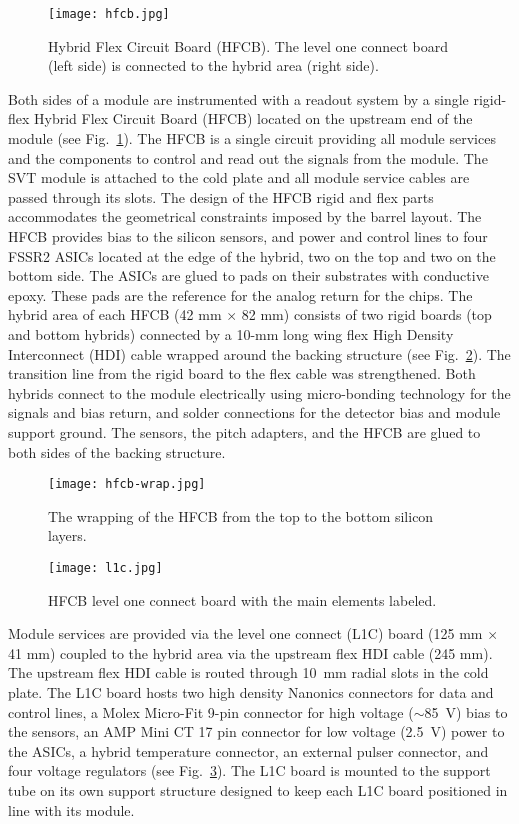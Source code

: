 \begin{figure}[h] 
\centering 
\texttt{[image: hfcb.jpg]}
\caption{Hybrid Flex Circuit Board (HFCB). The level one connect board (left side) is connected to the hybrid area (right side).}
\label{fig:HFCB}
\end{figure}

Both sides of a module are instrumented with a readout system by a single rigid-flex Hybrid Flex Circuit Board (HFCB) located on the upstream end of the module (see Fig.~\ref{fig:HFCB}). The HFCB is a single circuit providing all module services and the components to control and read out the signals from the module. The SVT module is attached to the cold plate and all module service cables are passed through its slots. The design of the HFCB rigid and flex parts accommodates the geometrical constraints imposed by the barrel layout. The HFCB provides bias to the silicon sensors, and power and control lines to four FSSR2 ASICs located at the edge of the hybrid, two on the top and two on the bottom side. The ASICs are glued to pads on their substrates with conductive epoxy. These pads are the reference for the analog return for the chips. The hybrid area of each HFCB (42 mm $\times$ 82 mm) consists of two rigid boards (top and bottom hybrids) connected by a 10-mm long wing flex High Density Interconnect (HDI) cable wrapped around the backing structure (see Fig.~\ref{fig:hfcb-wrap}). The transition line from the rigid board to the flex cable was strengthened. Both hybrids connect to the module electrically using micro-bonding technology for the signals and bias return, and solder connections for the detector bias and module support ground. The sensors, the pitch adapters, and the HFCB are glued to both sides of the backing structure. 

\begin{figure}[h] 
\centering 
\texttt{[image: hfcb-wrap.jpg]}
\caption{The wrapping of the HFCB from the top to the bottom silicon layers.}
\label{fig:hfcb-wrap}
\end{figure}

\begin{figure}[h] 
\centering 
\texttt{[image: l1c.jpg]}
\caption{HFCB level one connect board with the main elements labeled.}
\label{fig:l1c}
\end{figure}

Module services are provided via the level one connect (L1C) board (125 mm $\times$ 41 mm) coupled to the hybrid area via the upstream flex HDI cable (245 mm). The upstream flex HDI cable is routed through 10~mm radial slots in the cold plate. The L1C board hosts two high density Nanonics connectors for data and control lines, a Molex Micro-Fit 9-pin connector for high voltage ($\sim$85~V) bias to the sensors, an AMP Mini CT 17 pin connector for low voltage (2.5~V) power to the ASICs, a hybrid temperature connector, an external pulser connector, and four voltage regulators (see Fig.~\ref{fig:l1c}). The L1C board is mounted to the support tube on its own support structure designed to keep each L1C board positioned in line with its module.

